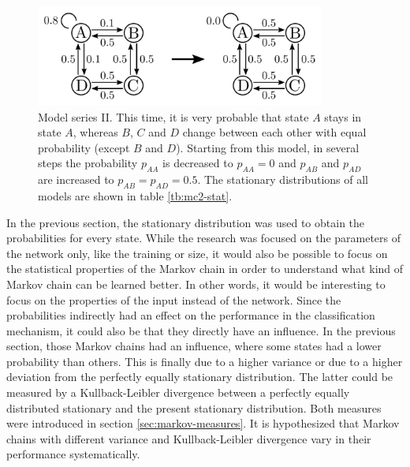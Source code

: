 \begin{figure}[!b]
	\centering
	\includegraphics[width=0.85\textwidth]{results/mc2_models}
	\caption[Markov model series II]{Model series II. This time, it is very probable that state $A$ stays in state $A$, whereas $B$, $C$ and $D$ change between each other with equal probability (except $B$ and $D$). Starting from this model, in several steps the probability $p_{AA}$ is decreased to $p_{AA} = 0$ and $p_{AB}$ and $p_{AD}$ are increased to $p_{AB} = p_{AD} = 0.5$. The stationary distributions of all models are shown in table \ref{tb:mc2-stat}.}
	\label{fig:mc2-models}
\end{figure}

In the previous section, the stationary distribution was used to obtain the probabilities for every state. While the research was focused on the parameters of the network only, like the training or size, it would also be possible to focus on the statistical properties of the Markov chain in order to understand what kind of Markov chain can be learned better. In other words, it would be interesting to focus on the properties of the input instead of the network. Since the probabilities indirectly had an effect on the performance in the classification mechanism, it could also be that they directly have an influence. In the previous section, those Markov chains had an influence, where some states had a lower probability than others. This is finally due to a higher variance or due to a higher deviation from the perfectly equally stationary distribution. The latter could be measured by a Kullback-Leibler divergence between a perfectly equally distributed stationary and the present stationary distribution. Both measures were introduced in section \ref{sec:markov-measures}. It is hypothesized that Markov chains with different variance and Kullback-Leibler divergence vary in their performance systematically.

